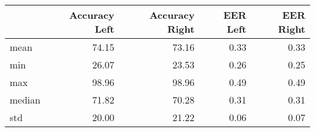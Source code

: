 \begin{tabular}{lrrrr}
\toprule
{} &  Accuracy Left &  Accuracy Right &  EER Left &  EER Right \\
\midrule
mean   &          74.15 &           73.16 &      0.33 &       0.33 \\
min    &          26.07 &           23.53 &      0.26 &       0.25 \\
max    &          98.96 &           98.96 &      0.49 &       0.49 \\
median &          71.82 &           70.28 &      0.31 &       0.31 \\
std    &          20.00 &           21.22 &      0.06 &       0.07 \\
\bottomrule
\end{tabular}
